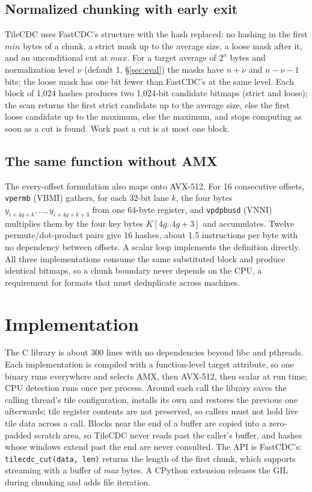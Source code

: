\documentclass[10pt,twocolumn]{article}
\begin{document}
\subsection{Normalized chunking with early exit}
TileCDC uses FastCDC's structure with the hash replaced: no hashing in the first $\textit{min}$ bytes of a chunk, a strict mask up to the average size, a loose mask after it, and an unconditional cut at $\textit{max}$. For a target average of $2^n$ bytes and normalization level $\nu$ (default 1, \S\ref{sec:eval}) the masks have $n+\nu$ and $n-\nu-1$ bits; the loose mask has one bit fewer than FastCDC's at the same level. Each block of 1,024 hashes produces two 1,024-bit candidate bitmaps (strict and loose); the scan returns the first strict candidate up to the average size, else the first loose candidate up to the maximum, else the maximum, and stops computing as soon as a cut is found. Work past a cut is at most one block.

\subsection{The same function without AMX}
The every-offset formulation also maps onto AVX-512. For 16 consecutive offsets, \texttt{vpermb} (VBMI) gathers, for each 32-bit lane $k$, the four bytes $y_{i+4g+k},\dots,y_{i+4g+k+3}$ from one 64-byte register, and \texttt{vpdpbusd} (VNNI) multiplies them by the four key bytes $K[4g..4g+3]$ and accumulates. Twelve permute/dot-product pairs give 16 hashes, about 1.5 instructions per byte with no dependency between offsets. A scalar loop implements the definition directly. All three implementations consume the same substituted block and produce identical bitmaps, so a chunk boundary never depends on the CPU, a requirement for formats that must deduplicate across machines.

\section{Implementation}
The C library is about 300 lines with no dependencies beyond libc and pthreads. Each implementation is compiled with a function-level target attribute, so one binary runs everywhere and selects AMX, then AVX-512, then scalar at run time; CPU detection runs once per process. Around each call the library saves the calling thread's tile configuration, installs its own and restores the previous one afterwards; tile register contents are not preserved, so callers must not hold live tile data across a call. Blocks near the end of a buffer are copied into a zero-padded scratch area, so TileCDC never reads past the caller's buffer, and hashes whose windows extend past the end are never consulted. The API is FastCDC's: \texttt{tilecdc\_cut(data, len)} returns the length of the first chunk, which supports streaming with a buffer of \textit{max} bytes. A CPython extension releases the GIL during chunking and adds file iteration.
\end{document}
